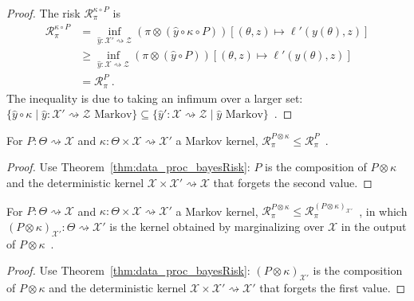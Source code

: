 \begin{proof}\leanok
\uses{}
The risk $\mathcal R^{\kappa \circ P}_\pi$ is
\begin{align*}
\mathcal R^{\kappa \circ P}_\pi
&= \inf_{\hat{y} : \mathcal X' \rightsquigarrow \mathcal Z} (\pi \otimes (\hat{y} \circ \kappa \circ P))\left[(\theta, z) \mapsto \ell'(y(\theta), z)\right]
\\
&\ge \inf_{\hat{y} : \mathcal X \rightsquigarrow \mathcal Z} (\pi \otimes (\hat{y} \circ P))\left[(\theta, z) \mapsto \ell'(y(\theta), z)\right]
\\
&= \mathcal R^{P}_\pi
\: .
\end{align*}
The inequality is due to taking an infimum over a larger set: $\{\hat{y} \circ \kappa \mid \hat{y} : \mathcal X' \rightsquigarrow \mathcal Z \text{ Markov}\} \subseteq \{\hat{y}' : \mathcal X \rightsquigarrow \mathcal Z \mid \hat{y} \text{ Markov}\}$~.
\end{proof}

\begin{lemma}
  \label{lem:bayesRisk_compProd_le_fst}
  \leanok
  For $P : \Theta \rightsquigarrow \mathcal X$ and $\kappa : \Theta \times \mathcal X \rightsquigarrow \mathcal X'$ a Markov kernel, $\mathcal R^{P \otimes \kappa}_\pi \le \mathcal R^{P}_\pi$~.
\end{lemma}

\begin{proof}\leanok
{}
Use Theorem~\ref{thm:data_proc_bayesRisk}: $P$ is the composition of $P \otimes \kappa$ and the deterministic kernel $\mathcal X \times \mathcal X' \rightsquigarrow \mathcal X$ that forgets the second value.
\end{proof}

\begin{lemma}
  \label{lem:bayesRisk_compProd_le_snd}
  For $P : \Theta \rightsquigarrow \mathcal X$ and $\kappa : \Theta \times \mathcal X \rightsquigarrow \mathcal X'$ a Markov kernel, $\mathcal R^{P \otimes \kappa}_\pi \le \mathcal R^{(P \otimes \kappa)_{\mathcal X'}}_\pi$~, in which $(P \otimes \kappa)_{\mathcal X'} : \mathcal \Theta \rightsquigarrow \mathcal X'$ is the kernel obtained by marginalizing over $\mathcal X$ in the output of $P \otimes \kappa$~.
\end{lemma}

\begin{proof}%
{}
Use Theorem~\ref{thm:data_proc_bayesRisk}: $(P \otimes \kappa)_{\mathcal X'}$ is the composition of $P \otimes \kappa$ and the deterministic kernel $\mathcal X \times \mathcal X' \rightsquigarrow \mathcal X'$ that forgets the first value.
\end{proof}

